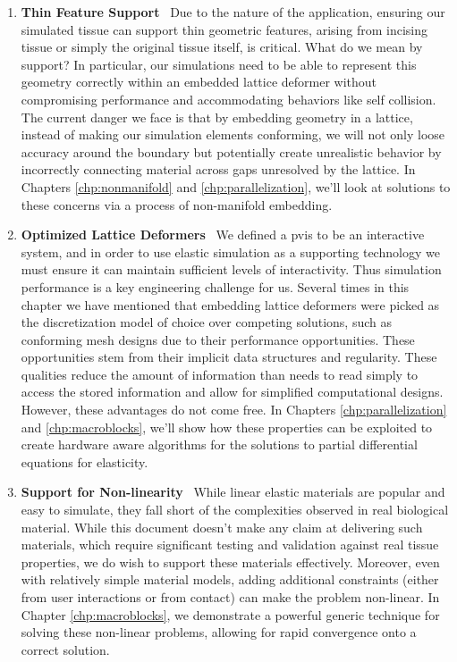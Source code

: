   \begin{enumerate}
    \item \textbf{Thin Feature Support}~ Due to the nature of the
      application, ensuring our simulated tissue can support thin
      geometric features, arising from incising tissue or simply the
      original tissue itself, is critical. What do we mean by support?
      In particular, our simulations need to be able to represent this
      geometry correctly within an embedded lattice deformer without
      compromising performance and accommodating behaviors like self
      collision. The current danger we face is that by embedding
      geometry in a lattice, instead of making our simulation elements
      conforming, we will not only loose accuracy around the boundary
      but potentially create unrealistic behavior by incorrectly connecting
      material across gaps unresolved by the lattice. In Chapters
      \ref{chp:nonmanifold} and \ref{chp:parallelization}, we'll look at
      solutions to these concerns via a process of non-manifold embedding.

    \item \textbf{Optimized Lattice Deformers}~ We defined a
      \gls{pvis} to be an interactive system, and in order to use
      elastic simulation as a supporting technology we must ensure it
      can maintain sufficient levels of interactivity. Thus simulation
      performance is a key engineering challenge for us. Several times in this
      chapter we have mentioned that embedding lattice deformers were
      picked as the discretization model of choice over competing
      solutions, such as conforming mesh designs due to their
      performance opportunities. These opportunities stem from their
      implicit data structures and regularity. These qualities reduce
      the amount of information than needs to read simply to access
      the stored information and allow for simplified computational
      designs.  However, these advantages do not come free. In
      Chapters \ref{chp:parallelization} and \ref{chp:macroblocks}, we'll show
      how these properties can be exploited to create hardware aware
      algorithms for the solutions to partial differential
      equations for elasticity. 
      
    \item \textbf{Support for Non-linearity}~ While linear elastic
      materials are popular and easy to simulate, they fall short of
      the complexities observed in real biological material. While
      this document doesn't make any claim at delivering such
      materials, which require significant testing and validation
      against real tissue properties, we do wish to support these
      materials effectively. Moreover, even with relatively simple
      material models, adding additional constraints (either from
      user interactions or from contact) can make the problem
      non-linear. In Chapter \ref{chp:macroblocks}, we demonstrate a
      powerful generic technique for solving these non-linear
      problems, allowing for rapid convergence onto a correct
      solution.
      

\end{enumerate}
